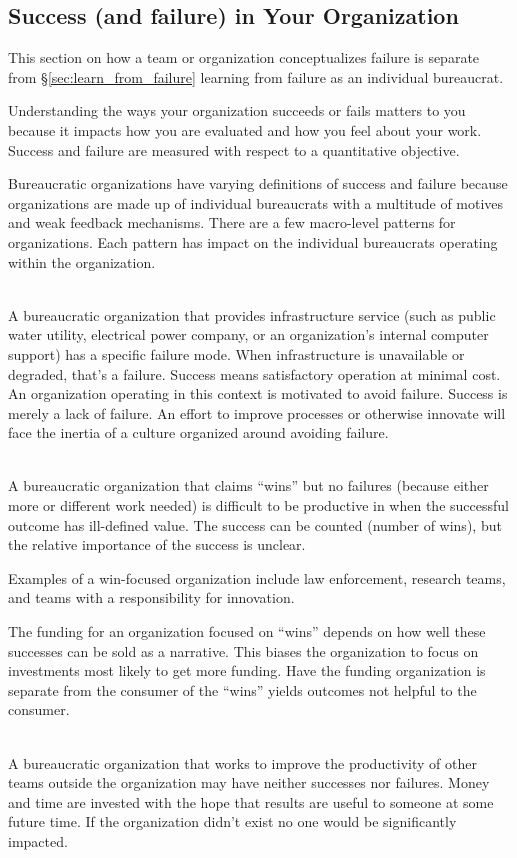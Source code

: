 \subsection{Success (and failure) in Your Organization\label{sec:org_failure_and_success}}

This section on how a team or organization conceptualizes failure is separate from \S\ref{sec:learn_from_failure} learning from failure as an individual bureaucrat. 

Understanding the ways your organization succeeds or fails matters to you because it impacts how you are evaluated and how you feel about your work. Success and failure are measured with respect to a quantitative objective. 


Bureaucratic organizations have varying definitions of success and failure because organizations are made up of individual bureaucrats with a multitude of motives and weak feedback mechanisms. There are a few macro-level patterns for organizations. Each pattern has impact on the individual bureaucrats operating within the organization. 

\ \\

A bureaucratic organization that provides infrastructure service (such as public water utility, electrical power company, or an organization's internal computer support) has a specific failure mode. When infrastructure is unavailable or degraded, that's a failure. Success means satisfactory operation at minimal cost. An organization operating in this context is motivated to avoid failure. Success is merely a lack of failure. An effort to improve processes or otherwise innovate will face the inertia of a culture organized around avoiding failure. 

\ \\

A bureaucratic organization that claims ``wins'' but no failures (because either more or different work needed) is difficult to be productive in when the successful outcome has ill-defined value. The success can be counted (number of wins), but the relative importance of the success is unclear.

Examples of a win-focused organization include law enforcement, research teams, and teams with a responsibility for innovation. 

The funding for an organization focused on ``wins'' depends on how well these successes can be sold as a narrative. This biases the organization to focus on investments most likely to get more funding. Have the funding organization is separate from the consumer of the ``wins'' yields outcomes not helpful to the consumer.

\ \\

A bureaucratic organization that works to improve the productivity of other teams outside the organization may have neither successes nor failures. Money and time are invested with the hope that results are useful to someone at some future time. If the organization didn't exist no one would be significantly impacted. 